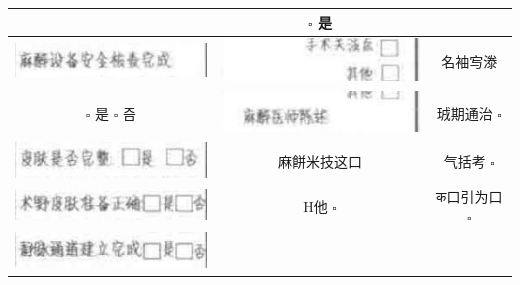 \documentclass[10pt]{article}
\begin{document}
\begin{center}
\begin{tabular}{|c|c|c|}
 & $\square$ 是 \\
\hline
\includegraphics[max width=\textwidth]{2024_07_05_645bb794a4d4f32ee0c8g-080(27)}
 & \includegraphics[max width=\textwidth]{2024_07_05_645bb794a4d4f32ee0c8g-080(34)}
 & 名袖㝍漛 \\
\hline
$\square$ 是 $\square$ 즘 & \includegraphics[max width=\textwidth]{2024_07_05_645bb794a4d4f32ee0c8g-080(13)}
 & 珬期通治 $\square$ \\
\hline
\includegraphics[max width=\textwidth]{2024_07_05_645bb794a4d4f32ee0c8g-080(20)}
 & 麻餅米技这口 & 气括考 $\square$ \\
\hline
\includegraphics[max width=\textwidth]{2024_07_05_645bb794a4d4f32ee0c8g-080(14)}
 & H他 $\square$ & क口引为口 $\square$ \\
\hline
\includegraphics[max width=\textwidth]{2024_07_05_645bb794a4d4f32ee0c8g-080(2)}

\end{tabular}
\end{center}
\end{document}

